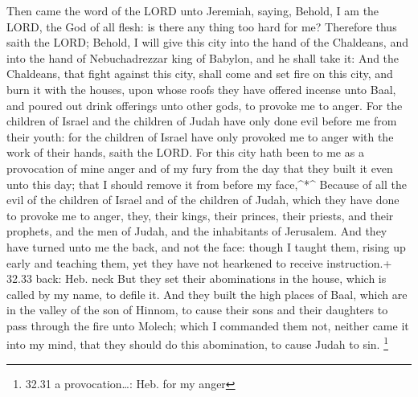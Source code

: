  Then came the word of the LORD unto Jeremiah, saying,
 Behold, I am the LORD, the God of all flesh: is there any
thing too hard for me?  Therefore thus saith the LORD;
Behold, I will give this city into the hand of the Chaldeans, and into
the hand of Nebuchadrezzar king of Babylon, and he shall take it:
 And the Chaldeans, that fight against this city, shall
come and set fire on this city, and burn it with the houses, upon whose
roofs they have offered incense unto Baal, and poured out drink
offerings unto other gods, to provoke me to anger.  For the
children of Israel and the children of Judah have only done evil before
me from their youth: for the children of Israel have only provoked me to
anger with the work of their hands, saith the LORD.  For
this city hath been to me as a provocation of mine anger and of my fury
from the day that they built it even unto this day; that I should remove
it from before my face,\^{}*\^{}  Because of all the evil
of the children of Israel and of the children of Judah, which they have
done to provoke me to anger, they, their kings, their princes, their
priests, and their prophets, and the men of Judah, and the inhabitants
of Jerusalem.  And they have turned unto me the back, and
not the face: though I taught them, rising up early and teaching them,
yet they have not hearkened to receive instruction.+ 32.33 back: Heb.
neck  But they set their abominations in the house, which
is called by my name, to defile it.  And they built the
high places of Baal, which are in the valley of the son of Hinnom, to
cause their sons and their daughters to pass through the fire unto
Molech; which I commanded them not, neither came it into my mind, that
they should do this abomination, to cause Judah to sin. \footnote{32.31
  a provocation\ldots: Heb. for my anger}

